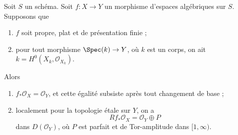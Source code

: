 \begin{lemma}
\label{lemma-proper-flat-h0}
Soit $S$ un sch\'ema.
Soit $f:X\to Y$ un morphisme d'espaces alg\'ebriques sur $S$. Supposons que
\begin{enumerate}
\item $f$ soit propre, plat et de pr\'esentation finie ;
\item pour tout morphisme $\Spec(k)\to Y$, o\`u $k$ est un corps, on ait
$k=H^0(X_k,\mathcal{O}_{X_k})$.
\end{enumerate}
Alors
\begin{enumerate}
\item[(a)] $f_*\mathcal{O}_X=\mathcal{O}_Y$, et cette \'egalit\'e subsiste apr\`es
tout changement de base ;
\item[(b)] localement pour la topologie \'etale sur $Y$, on a
$$
Rf_*\mathcal{O}_X = \mathcal{O}_Y \oplus P
$$
dans $D(\mathcal{O}_Y)$, o\`u $P$ est parfait et de Tor-amplitude dans
$[1,\infty)$.
\end{enumerate}
\end{lemma}

